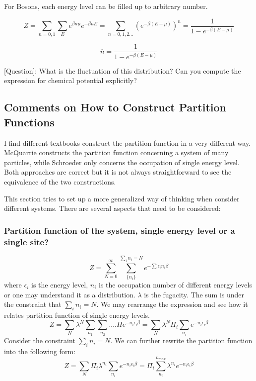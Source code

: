 \documentclass[12pt, oneside]{article}   	%
\begin{document}
\par 
For Bosons, each energy level can be filled up to arbitrary number. 

$$ Z = \sum_{n = 0,1} \sum_{E} e^{\beta n \mu} e^{-\beta n E} = \sum_{n = 0, 1,2...} (e^{-\beta(E- \mu)} )^n = \frac{1}{1- e^{-\beta(E - \mu)}}$$

$$\overline{n} = \frac{1}{1- e^{-\beta(E - \mu)}}$$
\par 

[Question]: What is the fluctuation of this distribution? Can you compute the expression for chemical potential explicitly?

\subsection{Comments on How to Construct Partition Functions}
\par
I find different textbooks construct the partition function in a very different way. McQuarrie constructs the partition function concerning a system of many particles, while Schroeder only concerns the occupation of single energy level. Both approaches are correct but it is not always straightforward to see the equivalence of the two constructions. 
\par
This section tries to set up a more generalized way of thinking when consider different systems. There are several aspects that need to be considered: 
\par
\subsubsection*{Partition function of the system, single energy level or a single site? }
\par
$$Z = \sum_{N=0}^{\infty} \sum_{\{n_i\}}^{\sum_i n_i = N}  e^{- \sum \epsilon_i n_i \beta}$$
where $\epsilon_i$ is the energy level, ${n_i}$ is the occupation number of different energy levels or one may understand it as a distribution. $\lambda$ is the fugacity. The sum is under the constraint that $\sum_i n_i = N$. We may rearrange the expression and see how it relates partition function of single energy levels.
$$Z = \sum_N \lambda^N \sum_{n_1} \sum_{n_2}....  \Pi e^{-n_i \epsilon_i \beta} = \sum_N \lambda^N \Pi_i  \sum_{n_i} e^{-n_i \epsilon_i \beta} $$
Consider the constraint $\sum_i n_i = N$. We can further rewrite the partition function into the following form: 
$$Z = \sum_N \Pi_i \lambda^{n_i} \sum_{n_i} e^{-n_i \epsilon_i \beta} = \Pi_i  \sum_{n_i}^{n_{max}} \lambda^{n_i} e^{-n_i \epsilon_i \beta}$$
\end{document}
